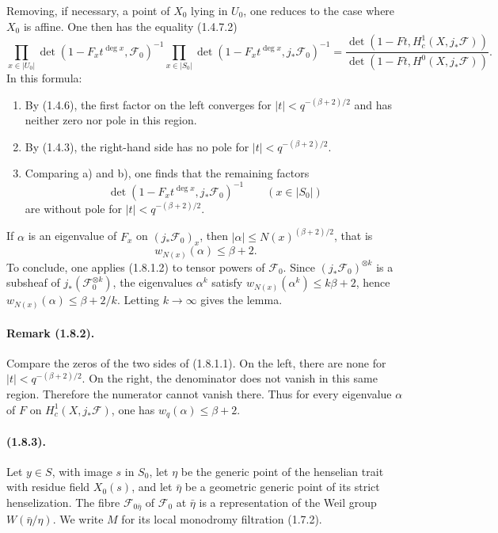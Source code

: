\documentclass[11pt]{article}
\theoremstyle{remark}
\begin{document}
Removing, if necessary, a point of $X_0$ lying in $U_0$, one reduces to the case where $X_0$ is affine. One then has the equality (1.4.7.2)
\begin{equation}\tag{1.8.1.1}
\prod_{x\in |U_0|}\det(1-F_x t^{\deg x},\mathcal F_0)^{-1}
\prod_{x\in |S_0|}\det(1-F_x t^{\deg x},j_*\mathcal F_0)^{-1}
=
\frac{\det(1-Ft,H^1_c(X,j_*\mathcal F))}
{\det(1-Ft,H^0(X,j_*\mathcal F))}.
\end{equation}
In this formula:
\begin{enumerate}[label=\alph*)]
\item By (1.4.6), the first factor on the left converges for $|t|<q^{-(\beta+2)/2}$ and has neither zero nor pole in this region.
\item By (1.4.3), the right-hand side has no pole for $|t|<q^{-(\beta+2)/2}$.
\item Comparing a) and b), one finds that the remaining factors
\[
\det(1-F_x t^{\deg x},j_*\mathcal F_0)^{-1}\qquad (x\in |S_0|)
\]
are without pole for $|t|<q^{-(\beta+2)/2}$.
\end{enumerate}
If $\alpha$ is an eigenvalue of $F_x$ on $(j_*\mathcal F_0)_x$, then $|\alpha|\le N(x)^{(\beta+2)/2}$, that is
\begin{equation}\tag{1.8.1.2}
w_{N(x)}(\alpha)\le \beta+2.
\end{equation}
To conclude, one applies (1.8.1.2) to tensor powers of $\mathcal F_0$. Since $(j_*\mathcal F_0)^{\otimes k}$ is a subsheaf of $j_*(\mathcal F_0^{\otimes k})$, the eigenvalues $\alpha^k$ satisfy $w_{N(x)}(\alpha^k)\le k\beta+2$, hence $w_{N(x)}(\alpha)\le \beta+2/k$. Letting $k\to\infty$ gives the lemma.

\paragraph{Remark (1.8.2).}
Compare the zeros of the two sides of (1.8.1.1). On the left, there are none for $|t|<q^{-(\beta+2)/2}$. On the right, the denominator does not vanish in this same region. Therefore the numerator cannot vanish there. Thus for every eigenvalue $\alpha$ of $F$ on $H^1_c(X,j_*\mathcal F)$, one has $w_q(\alpha)\le \beta+2$.

\paragraph{(1.8.3).}
Let $y\in S$, with image $s$ in $S_0$, let $\eta$ be the generic point of the henselian trait with residue field $X_0(s)$, and let $\bar\eta$ be a geometric generic point of its strict henselization. The fibre $\mathcal F_{0\bar\eta}$ of $\mathcal F_0$ at $\bar\eta$ is a representation of the Weil group $W(\bar\eta/\eta)$. We write $M$ for its local monodromy filtration (1.7.2).
\end{document}
